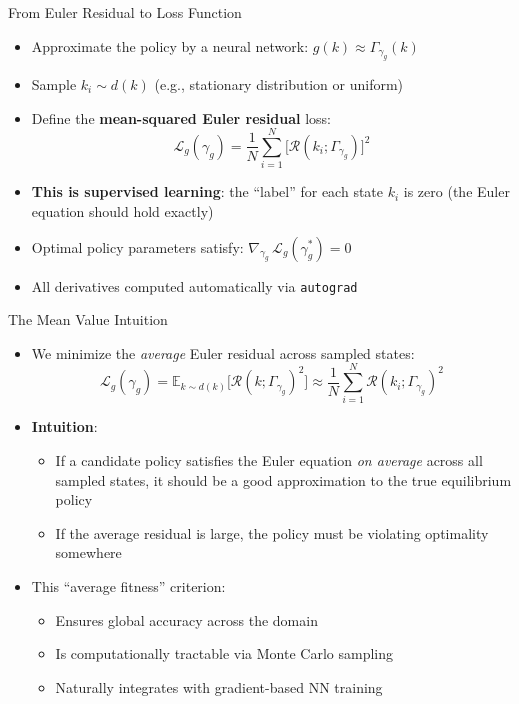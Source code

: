 \documentclass[10pt,english,aspectratio=169]{beamer}
\begin{document}
\begin{frame}{From Euler Residual to Loss Function}
\begin{itemize}
  \item Approximate the policy by a neural network: $g(k) \approx \Gamma_{\gamma_g}(k)$
  \medskip
  \item Sample $k_i \sim d(k)$ (e.g., stationary distribution or uniform)
  \medskip
  \item Define the \textbf{mean-squared Euler residual} loss:
    \[
      \mathcal{L}_g(\gamma_g) = \frac{1}{N}\sum_{i=1}^{N} \bigl[\mathcal{R}(k_i; \Gamma_{\gamma_g})\bigr]^2
    \]
  \medskip
  \item \textbf{This is supervised learning}: the ``label'' for each state $k_i$ is zero (the Euler equation should hold exactly)
  \medskip
  \item Optimal policy parameters satisfy: $\nabla_{\gamma_g}\, \mathcal{L}_g(\gamma_g^*) = 0$
  \item All derivatives computed automatically via \texttt{autograd}
\end{itemize}
\end{frame}

\begin{frame}{The Mean Value Intuition}
\begin{itemize}
  \item We minimize the \emph{average} Euler residual across sampled states:
    \[
      \mathcal{L}_g(\gamma_g) = \mathbb{E}_{k \sim d(k)}\bigl[\mathcal{R}(k; \Gamma_{\gamma_g})^2\bigr] \approx \frac{1}{N}\sum_{i=1}^{N} \mathcal{R}(k_i; \Gamma_{\gamma_g})^2
    \]
  \medskip
  \item \textbf{Intuition}:
    \begin{itemize}
      \item If a candidate policy satisfies the Euler equation \emph{on average} across all sampled states, it should be a good approximation to the true equilibrium policy
      \item If the average residual is large, the policy must be violating optimality somewhere
    \end{itemize}
  \medskip
  \item This ``average fitness'' criterion:
    \begin{itemize}
      \item Ensures global accuracy across the domain
      \item Is computationally tractable via Monte Carlo sampling
      \item Naturally integrates with gradient-based NN training
    \end{itemize}
\end{itemize}
\end{frame}
\end{document}
